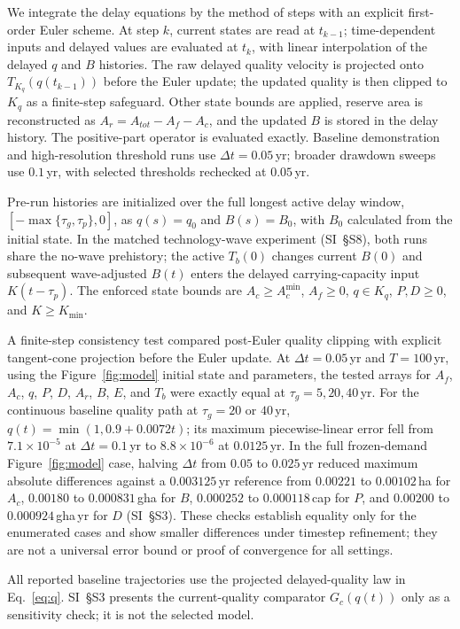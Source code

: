 \documentclass[preprint,12pt,authoryear]{elsarticle}
\newcommand{\Acmin}{A_c^{\min}}
\begin{document}
We integrate the delay equations by the method of steps with an explicit first-order Euler scheme. At step $k$, current states are read at $t_{k-1}$; time-dependent inputs and delayed values are evaluated at $t_k$, with linear interpolation of the delayed $q$ and $B$ histories. The raw delayed quality velocity is projected onto $T_{K_q}(q(t_{k-1}))$ before the Euler update; the updated quality is then clipped to $K_q$ as a finite-step safeguard. Other state bounds are applied, reserve area is reconstructed as $A_r=A_{tot}-A_f-A_c$, and the updated $B$ is stored in the delay history. The positive-part operator is evaluated exactly. Baseline demonstration and high-resolution threshold runs use $\Delta t=0.05$\,yr; broader drawdown sweeps use $0.1$\,yr, with selected thresholds rechecked at $0.05$\,yr.

Pre-run histories are initialized over the full longest active delay window, $[-\max\{\tau_g,\tau_p\},0]$, as $q(s)=q_0$ and $B(s)=B_0$, with $B_0$ calculated from the initial state. In the matched technology-wave experiment (SI~\S S8), both runs share the no-wave prehistory; the active $T_b(0)$ changes current $B(0)$ and subsequent wave-adjusted $B(t)$ enters the delayed carrying-capacity input $K(t-\tau_p)$. The enforced state bounds are $A_c\ge\Acmin$, $A_f\ge0$, $q\in K_q$, $P,D\ge0$, and $K\ge K_{\min}$.

A finite-step consistency test compared post-Euler quality clipping with explicit tangent-cone projection before the Euler update. At $\Delta t=0.05$\,yr and $T=100$\,yr, using the Figure~\ref{fig:model} initial state and parameters, the tested arrays for $A_f$, $A_c$, $q$, $P$, $D$, $A_r$, $B$, $E$, and $T_b$ were exactly equal at $\tau_g=5,20,40$\,yr. For the continuous baseline quality path at $\tau_g=20$ or $40$\,yr, $q(t)=\min(1,0.9+0.0072t)$; its maximum piecewise-linear error fell from $7.1\times10^{-5}$ at $\Delta t=0.1$\,yr to $8.8\times10^{-6}$ at $0.0125$\,yr. In the full frozen-demand Figure~\ref{fig:model} case, halving $\Delta t$ from $0.05$ to $0.025$\,yr reduced maximum absolute differences against a $0.003125$\,yr reference from $0.00221$ to $0.00102$\,ha for $A_c$, $0.00180$ to $0.000831$\,gha for $B$, $0.000252$ to $0.000118$\,cap for $P$, and $0.00200$ to $0.000924$\,gha\,yr for $D$ (SI~\S S3). These checks establish equality only for the enumerated cases and show smaller differences under timestep refinement; they are not a universal error bound or proof of convergence for all settings.

All reported baseline trajectories use the projected delayed-quality law in Eq.~\eqref{eq:q}. SI~\S S3 presents the current-quality comparator $G_c(q(t))$ only as a sensitivity check; it is not the selected model.
\end{document}
